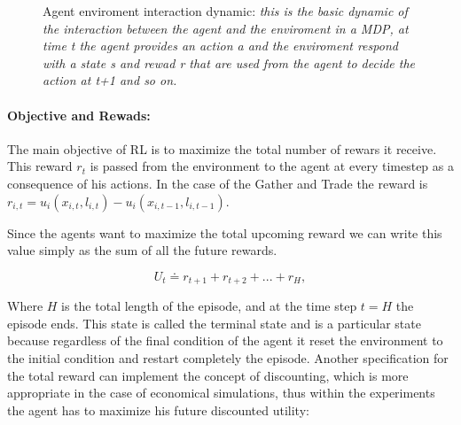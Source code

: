 \begin{figure}[!h]
  \centering
  \caption[Agent enviroment interaction dynamic: ]%
  {\label{img:a-e_dynamic}Agent enviroment interaction dynamic: \small \textit{this is the basic dynamic of the interaction between the agent and the enviroment in a MDP, at time t the agent provides an action a and the enviroment respond with a state s and rewad r that are used from the agent to decide the action at t+1 and so on.}}
\end{figure}


\paragraph{Objective and Rewads:} The main objective of RL is to maximize the total number of rewars it receive. This reward \( r_t \) is passed from the environment to the agent at every timestep as a consequence of his actions. In the case of the Gather and Trade the reward is \( r_{i,t} = u_i(x_{i,t},l_{i,t})  - u_i(x_{i,t-1},l_{i,t-1}) \). 

Since the agents want to maximize the total upcoming reward we can write this value simply as the sum of all the future rewards.

\begin{equation*}
U_t \doteq r_{t+1} + r_{t+2} + ... + r_{H},
\end{equation*}

Where \( H \) is the total length of the episode, and at the time step \( t = H \) the episode ends. This state is called the terminal state and is a particular state because regardless of the final condition of the agent it reset the environment to the initial condition and restart completely the episode.
Another specification for the total reward can implement the concept of discounting, which is more appropriate in the case of economical simulations, thus within the experiments the agent has to maximize his future discounted utility:

